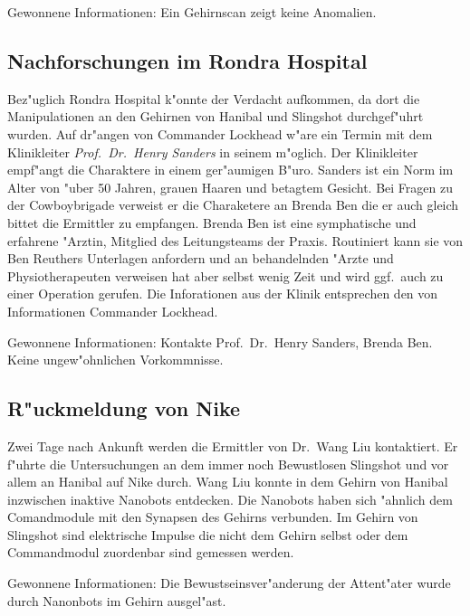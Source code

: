 \begin{remarks}
	Gewonnene Informationen: Ein Gehirnscan zeigt keine Anomalien.
\end{remarks}


\subsection{Nachforschungen im Rondra Hospital}

Bez"uglich Rondra Hospital k"onnte der Verdacht aufkommen, da\3 dort die Manipulationen an den Gehirnen von Hanibal und Slingshot durchgef"uhrt wurden. Auf dr"angen von Commander Lockhead w"are ein Termin mit dem Klinikleiter \emph{Prof.~Dr.~Henry Sanders} in seinem m"oglich. Der Klinikleiter empf"angt die Charaktere in einem ger"aumigen B"uro. Sanders ist ein Norm im Alter von "uber 50 Jahren, grauen Haaren und betagtem Gesicht. Bei Fragen zu der Cowboybrigade verweist er die Charaketere an Brenda Ben die er auch gleich bittet die Ermittler zu empfangen. Brenda Ben ist eine symphatische und erfahrene "Arztin, Mitglied des Leitungsteams der Praxis. Routiniert kann sie von Ben Reuthers Unterlagen anfordern und an behandelnden "Arzte und Physiotherapeuten verweisen hat aber selbst wenig Zeit und wird ggf.~auch zu einer Operation gerufen. Die Inforationen aus der Klinik entsprechen den von Informationen Commander Lockhead.

\begin{remarks}
	Gewonnene Informationen: Kontakte Prof.~Dr.~Henry Sanders, Brenda Ben. Keine ungew"ohnlichen Vorkommnisse.
\end{remarks}


\subsection{R"uckmeldung von Nike}

Zwei Tage nach Ankunft werden die Ermittler von Dr.~Wang Liu kontaktiert. Er f"uhrte die Untersuchungen an dem immer noch Bewustlosen Slingshot und vor allem an Hanibal auf Nike durch. Wang Liu konnte in dem Gehirn von Hanibal inzwischen inaktive Nanobots entdecken. Die Nanobots haben sich "ahnlich dem Comandmodule mit den Synapsen des Gehirns verbunden. Im Gehirn von Slingshot sind elektrische Impulse die nicht dem Gehirn selbst oder dem Commandmodul zuordenbar sind gemessen werden.

\begin{remarks}
	Gewonnene Informationen: Die Bewustseinsver"anderung der Attent"ater wurde durch Nanonbots im Gehirn ausgel"ast.
\end{remarks}


